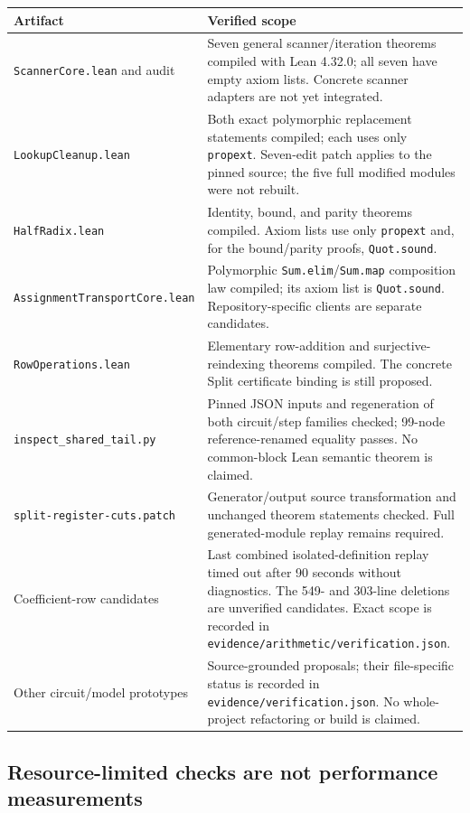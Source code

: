 \documentclass[11pt,letterpaper]{article}
\newcommand{\code}[1]{\nolinkurl{#1}}
\begin{document}
\begin{longtable}{p{}p{}}
\toprule
Artifact & Verified scope\\
\midrule
\endhead
\code{ScannerCore.lean} and audit & Seven general scanner/iteration theorems
compiled with Lean 4.32.0; all seven have empty axiom lists. Concrete scanner
adapters are not yet integrated.\\
\code{LookupCleanup.lean} & Both exact polymorphic replacement statements
compiled; each uses only \code{propext}. Seven-edit patch applies to the pinned
source; the five full modified modules were not rebuilt.\\
\code{HalfRadix.lean} & Identity, bound, and parity theorems compiled. Axiom
lists use only \code{propext} and, for the bound/parity proofs, \code{Quot.sound}.\\
\code{AssignmentTransportCore.lean} & Polymorphic \code{Sum.elim}/\code{Sum.map}
composition law compiled; its axiom list is \code{Quot.sound}. Repository-specific
clients are separate candidates.\\
\code{RowOperations.lean} & Elementary row-addition and surjective-reindexing
theorems compiled. The concrete Split certificate binding is still proposed.\\
\code{inspect_shared_tail.py} & Pinned JSON inputs and regeneration of both
circuit/step families checked; 99-node reference-renamed equality passes.
No common-block Lean semantic theorem is claimed.\\
\code{split-register-cuts.patch} & Generator/output source transformation and
unchanged theorem statements checked. Full generated-module replay remains
required.\\
Coefficient-row candidates & Last combined isolated-definition replay timed
out after 90 seconds without diagnostics. The 549- and 303-line deletions are
unverified candidates. Exact scope is recorded in
\code{evidence/arithmetic/verification.json}.\\
Other circuit/model prototypes & Source-grounded proposals; their file-specific
status is recorded in \code{evidence/verification.json}. No whole-project
refactoring or build is claimed.\\
\bottomrule
\end{longtable}

\subsection{Resource-limited checks are not performance measurements}
\end{document}
